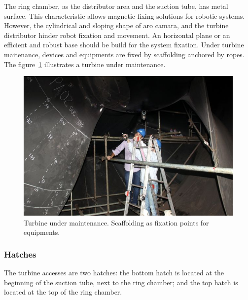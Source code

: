The ring chamber, as the distributor area and the suction tube, has metal
surface. This characteristic allows magnetic fixing solutions for robotic
systems. However, the cylindrical and sloping shape of aro camara, and the
turbine distributor hinder robot fixation and movement. An horizontal plane or
an efficient and robust base should be build for the system fixation.
Under turbine maitenance, devices and equipments are fixed by scaffolding
anchored by ropes. The figure~\ref{fig::andaime} illustrates a turbine under
maintenance.


\begin{figure}[h!]	
	\includegraphics[width=\columnwidth]{figs/viagem/2015_04_28/UG/img_4969}
	\caption{Turbine under maintenance. Scaffolding as fixation points for
	equipments.}
	\label{fig::andaime}
\end{figure}

 
\subsubsection{Hatches}
The turbine accesses are two hatches: the bottom hatch is located at the
beginning of the suction tube, next to the ring chamber; and the top hatch is
located at the top of the ring chamber.

